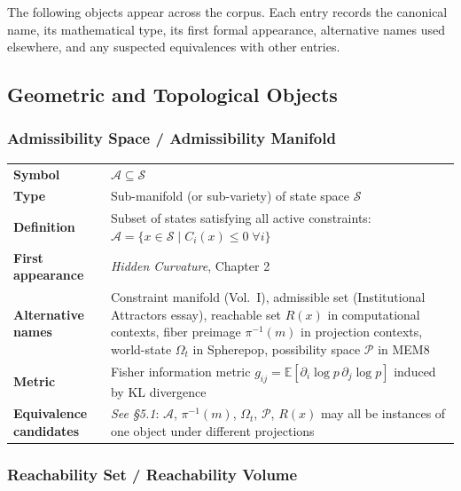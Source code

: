 \documentclass[11pt, a4paper]{article}
\begin{document}
The following objects appear across the corpus. Each entry records the
canonical name, its mathematical type, its first formal appearance,
alternative names used elsewhere, and any suspected equivalences with
other entries.

\subsection{Geometric and Topological Objects}

\subsubsection{Admissibility Space / Admissibility Manifold}

\begin{longtable}{lp{10cm}}
\textbf{Symbol} & $\mathcal{A} \subseteq \mathcal{S}$ \\
\textbf{Type} & Sub-manifold (or sub-variety) of state space $\mathcal{S}$ \\
\textbf{Definition} & Subset of states satisfying all active constraints:
  $\mathcal{A} = \{x \in \mathcal{S} \mid C_i(x) \leq 0\; \forall i\}$ \\
\textbf{First appearance} & \textit{Hidden Curvature}, Chapter 2 \\
\textbf{Alternative names} & Constraint manifold (Vol.~I), admissible set
  (Institutional Attractors essay), reachable set $R(x)$ in computational
  contexts, fiber preimage $\pi^{-1}(m)$ in projection contexts,
  world-state $\Omega_t$ in Spherepop, possibility space $\mathcal{P}$
  in MEM\textbar{}8 \\
\textbf{Metric} & Fisher information metric $g_{ij} = \mathbb{E}[
  \partial_i \log p\, \partial_j \log p]$ induced by KL divergence \\
\textbf{Equivalence candidates} & \textit{See §5.1}: $\mathcal{A}$,
  $\pi^{-1}(m)$, $\Omega_t$, $\mathcal{P}$, $R(x)$ may all be instances
  of one object under different projections \\
\end{longtable}

\subsubsection{Reachability Set / Reachability Volume}
\end{document}
